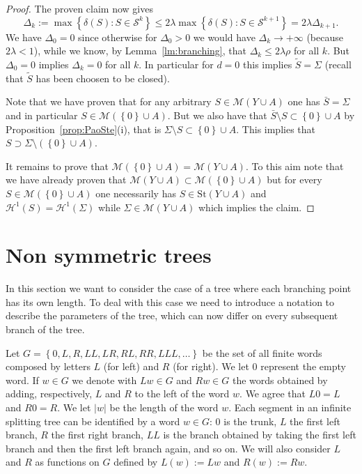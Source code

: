 \documentclass{amsart}
\renewcommand{\H}{\mathcal H}
\newcommand{\abs}[1]{\left\vert #1 \right\vert}
\newcommand{\ENCLOSE}[1]{\left\{#1\right\}}
\newcommand{\St}{\mathrm{St}}
\newcommand{\M}{\mathcal{M}}
\renewcommand{\H}{\mathcal{H}}
\renewcommand{\S}{\mathcal{S}}
\theoremstyle{definition}
\theoremstyle{remark}
\begin{document}
\begin{proof}
The proven claim now gives 
\[
  \Delta_k 
  := \max\ENCLOSE{\delta(S)\colon S\in \S^k}
   \le 2\lambda \max\ENCLOSE{\delta(S)\colon S\in \S^{k+1}}
   = 2 \lambda \Delta_{k+1}.
\]
We have $\Delta_0 = 0$ since otherwise for 
$\Delta_0>0$ we would have 
$\Delta_k\to +\infty$ (because $2\lambda <1$), while we know,
by Lemma~\ref{lm:branching}, that $\Delta_k \le 2\lambda\rho$
for all $k$.
But $\Delta_0 =0$ implies $\Delta_k=0$ for all $k$.
In particular for $d=0$ this implies $\tilde S=\Sigma$ 
(recall that $\tilde S$ has been choosen to be closed).

Note that we have proven that for any arbitrary $S\in \M(Y\cup A)$ 
one has $\bar S= \Sigma$ and in particular $S\in \M(\ENCLOSE 0 \cup A)$. 
But we also have that $\bar S \setminus S \subset \ENCLOSE{0}\cup A$
by Proposition~\ref{prop:PaoSte}(i),
that is $\Sigma\setminus S \subset \ENCLOSE 0 \cup A$.
This implies that $S\supset \Sigma\setminus(\ENCLOSE 0 \cup A)$.

It remains to prove that $\M(\ENCLOSE 0 \cup A) = \M(Y\cup A)$.
To this aim note that we have already proven 
that $\M(Y\cup A) \subset \M(\ENCLOSE 0 \cup A)$
but for every $S\in \M(\ENCLOSE 0 \cup A)$ one necessarily has 
$S\in \St(Y\cup A)$ and $\H^1(S)=\H^1(\Sigma)$ while
$\Sigma \in \M(Y\cup A)$ which implies the claim.

\end{proof}


\section{Non symmetric trees}

In this section we want to consider the case of a tree where each branching point has its own length.
To deal with this case we need to introduce a notation to describe the parameters of the tree, which 
can now differ on every subsequent branch of the tree.

Let $G=\ENCLOSE{0,L,R,LL,LR,RL,RR,LLL,\dots}$ be the set of all finite words composed by letters 
$L$ (for left) and $R$ (for right). We let $0$ represent the empty word.
If $w\in G$ we denote with $Lw\in G$ and $Rw\in G$ the words obtained by adding, 
respectively, $L$ and $R$ to the left of the word $w$.
We agree that $L0=L$ and $R0=R$.
We let $\abs{w}$ be the length of the word $w$.
Each segment in an infinite splitting tree can be identified by a word $w\in G$:
$0$ is the trunk, $L$ the first left branch, $R$ the first right branch, $LL$ is the branch obtained by taking
the first left branch and then the first left branch again, and so on.
We will also consider $L$ and $R$ as functions on $G$ defined by $L(w):=Lw$ and $R(w):=Rw$.
\end{document}

